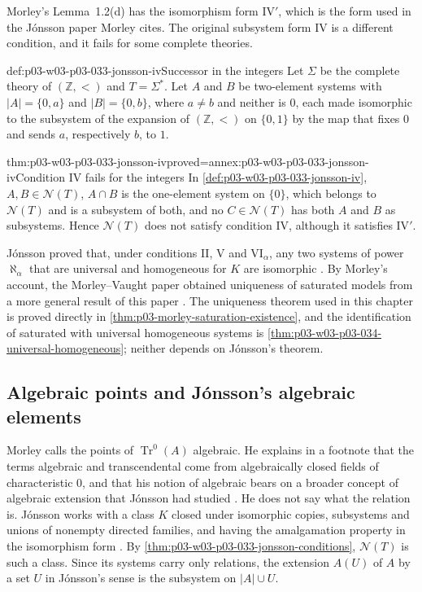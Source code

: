 Morley's Lemma~1.2(d) has the isomorphism form IV\('\), which is the form
used in the Jónsson paper Morley cites. The original subsystem form IV is
a different condition, and it fails for some complete theories.

\begin{hbexample}{def:p03-w03-p03-033-jonsson-iv}{Successor in the integers}
Let \(\Sigma\) be the complete theory of \((\mathbb Z,<)\) and
\(T=\Sigma^*\). Let \(A\) and \(B\) be two-element systems with
\(|A|=\{0,a\}\) and \(|B|=\{0,b\}\), where \(a\neq b\) and neither is
\(0\), each made isomorphic to the subsystem of the expansion of
\((\mathbb Z,<)\) on \(\{0,1\}\) by the map that fixes \(0\) and sends
\(a\), respectively \(b\), to \(1\).
\end{hbexample}

\begin{hbtheorem}{thm:p03-w03-p03-033-jonsson-iv}{proved=annex:p03-w03-p03-033-jonsson-iv}{Condition IV fails for the integers}
In \cref{def:p03-w03-p03-033-jonsson-iv}, \(A,B\in\mathcal N(T)\),
\(A\cap B\) is the one-element system on \(\{0\}\), which belongs to
\(\mathcal N(T)\) and is a subsystem of both, and no \(C\in\mathcal N(T)\)
has both \(A\) and \(B\) as subsystems. Hence \(\mathcal N(T)\) does not
satisfy condition IV, although it satisfies IV\('\).
\end{hbtheorem}

Jónsson proved that, under conditions II, V and VI\(_\alpha\), any two
systems of power \(\aleph_\alpha\) that are universal and homogeneous for
\(K\) are isomorphic \cite[p.~139, Theorem~B]{Jonsson1960}. By Morley's
account, the Morley--Vaught paper obtained uniqueness of saturated models
from a more general result of this paper \cite[p.~514, n.~2]{Morley1965}.
The uniqueness theorem used in this chapter is proved directly in
\cref{thm:p03-morley-saturation-existence}, and the identification of
saturated with universal homogeneous systems is
\cref{thm:p03-w03-p03-034-universal-homogeneous}; neither depends on
Jónsson's theorem.

\subsection{Algebraic points and Jónsson's algebraic elements}
\label{sec:p03-w03-p03-033-jonsson-algebraic}

Morley calls the points of \(\operatorname{Tr}^0(A)\) algebraic. He
explains in a footnote that the terms algebraic and transcendental come
from algebraically closed fields of characteristic \(0\), and that his
notion of algebraic bears on a broader concept of algebraic extension
that Jónsson had studied \cite[p.~520, n.~12]{Morley1965}. He
does not say what the relation is. Jónsson works with a class \(K\) closed
under isomorphic copies, subsystems and unions of nonempty directed
families, and having the amalgamation property in the isomorphism form
\cite[pp.~179--180]{Jonsson1962}. By
\cref{thm:p03-w03-p03-033-jonsson-conditions}, \(\mathcal N(T)\) is such
a class. Since its systems carry only relations, the extension \(A(U)\)
of \(A\) by a set \(U\) in Jónsson's sense
\cite[p.~184, Definition~4.1]{Jonsson1962} is the subsystem on
\(|A|\cup U\).

